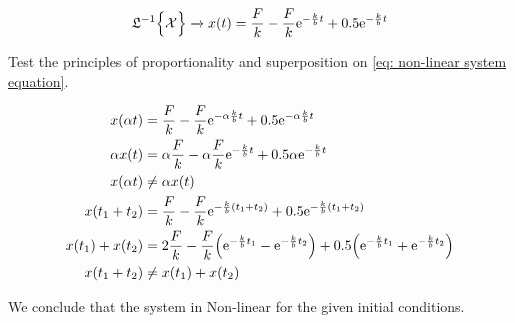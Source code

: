 \begin{equation}
 \mathfrak{L}^{-1} \Bigl \{ \mathcal{X} \Bigr \} 
\xrightarrow{} x(t) = \frac{F}{k} - \frac{F}{k} 
\mathrm{e}^{-\frac{k}{b}t} + 0.5 \mathrm{e}^{-\frac{k}{b}t}
\label{eq: non-linear system equation}
\end{equation}

Test the principles of proportionality and superposition on 
\ref{eq: non-linear system equation}.

\begin{equation*}
 \begin{split}
 x(\alpha t) & = \frac{F}{k} - \frac{F}{k} 
\mathrm{e}^{-\alpha \frac{k}{b}t} + 0.5 
\mathrm{e}^{-\alpha \frac{k}{b}t}\\
 \alpha x(t) &= \alpha \frac{F}{k} - \alpha \frac{F}{k} 
\mathrm{e}^{-\frac{k}{b}t} + 0.5 \alpha 
\mathrm{e}^{-\frac{k}{b}t}\\
x(\alpha t) & \neq \alpha x(t)\\
  x( t_1 + t_2) & = \frac{F}{k} - \frac{F}{k} 
\mathrm{e}^{-\frac{k}{b}(t_1+t_2)} + 0.5 
\mathrm{e}^{-\frac{k}{b}(t_1+t_2)}\\
x(t_1) +  x(t_2) & = 2 \frac{F}{k} - 
\frac{F}{k} \Bigl ( 
\mathrm{e}^{- \frac{k}{b}t_1} -\mathrm{e}^{- \frac{k}{b}t_2} 
\Bigr ) + 0.5 
\Bigl (\mathrm{e}^{- \frac{k}{b}t_1}
 +
\mathrm{e}^{- \frac{k}{b}t_2} \Bigr) \\
x(t_1 + t_2) & \neq x(t_1) + x(t_2)\\
 \end{split}
\end{equation*}

We conclude that the system in Non-linear for the given 
initial conditions.
